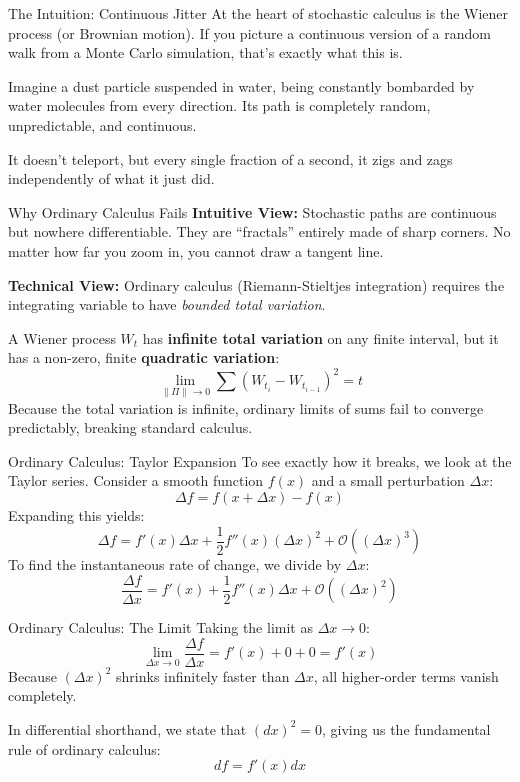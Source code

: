 \documentclass{beamer}
\begin{document}
\begin{frame}{The Intuition: Continuous Jitter}
At the heart of stochastic calculus is the Wiener process (or Brownian motion). If you picture a continuous version of a random walk from a Monte Carlo simulation, that’s exactly what this is.
\medskip

Imagine a dust particle suspended in water, being constantly bombarded by water molecules from every direction. Its path is completely random, unpredictable, and continuous.
\medskip

It doesn't teleport, but every single fraction of a second, it zigs and zags independently of what it just did.
\end{frame}

\begin{frame}{Why Ordinary Calculus Fails}
\textbf{Intuitive View:} Stochastic paths are continuous but nowhere differentiable. They are ``fractals'' entirely made of sharp corners. No matter how far you zoom in, you cannot draw a tangent line.
\medskip

\textbf{Technical View:} Ordinary calculus (Riemann-Stieltjes integration) requires the integrating variable to have \textit{bounded total variation}. 
\medskip

A Wiener process $W_t$ has \textbf{infinite total variation} on any finite interval, but it has a non-zero, finite \textbf{quadratic variation}:
\[
\lim_{\|\Pi\| \to 0} \sum (W_{t_i} - W_{t_{i-1}})^2 = t
\]
Because the total variation is infinite, ordinary limits of sums fail to converge predictably, breaking standard calculus.
\end{frame}

\begin{frame}{Ordinary Calculus: Taylor Expansion}
To see exactly how it breaks, we look at the Taylor series. Consider a smooth function $f(x)$ and a small perturbation $\Delta x$:
\[
\Delta f = f(x + \Delta x) - f(x)
\]
Expanding this yields:
\[
\Delta f = f'(x)\Delta x + \frac{1}{2}f''(x)(\Delta x)^2 + \mathcal{O}((\Delta x)^3)
\]
To find the instantaneous rate of change, we divide by $\Delta x$:
\[
\frac{\Delta f}{\Delta x} = f'(x) + \frac{1}{2}f''(x)\Delta x + \mathcal{O}((\Delta x)^2)
\]
\end{frame}

\begin{frame}{Ordinary Calculus: The Limit}
Taking the limit as $\Delta x \to 0$:
\[
\lim_{\Delta x \to 0} \frac{\Delta f}{\Delta x} = f'(x) + 0 + 0 = f'(x)
\]
Because $(\Delta x)^2$ shrinks infinitely faster than $\Delta x$, all higher-order terms vanish completely.
\medskip

In differential shorthand, we state that $(dx)^2 = 0$, giving us the fundamental rule of ordinary calculus:
\[
df = f'(x) dx
\]
\end{frame}
\end{document}
